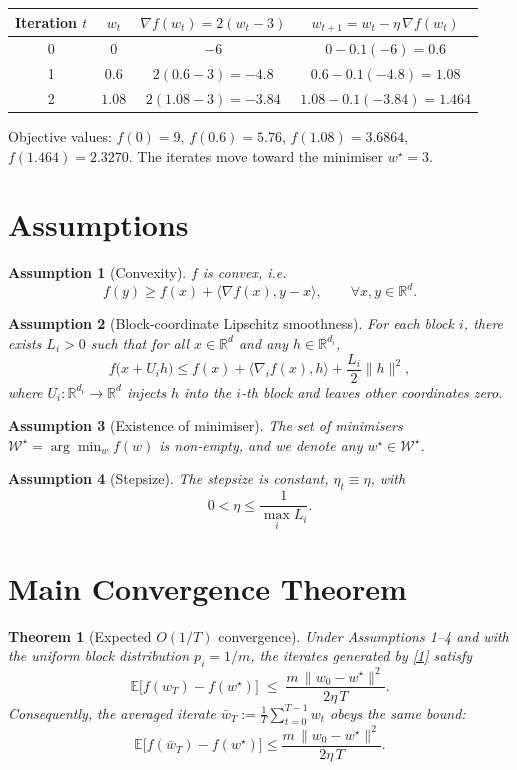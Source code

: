 \documentclass{article}
\newtheorem{theorem}{Theorem}
\newtheorem{assumption}{Assumption}
\newcommand{\E}{\mathbb{E}}
\newcommand{\R}{\mathbb{R}}
\begin{document}
\begin{center}
\begin{tabular}{c|c|c|c}
Iteration $t$ & $w_t$ & $\nabla f(w_t)=2(w_t-3)$ & $w_{t+1}=w_t-\eta\,\nabla f(w_t)$\\\hline
0 & $0$ & $-6$ & $0-0.1(-6)=0.6$\\
1 & $0.6$ & $2(0.6-3)=-4.8$ & $0.6-0.1(-4.8)=1.08$\\
2 & $1.08$ & $2(1.08-3)=-3.84$ & $1.08-0.1(-3.84)=1.464$\\
\end{tabular}
\end{center}
Objective values:
$f(0)=9$, $f(0.6)=5.76$, $f(1.08)=3.6864$, $f(1.464)=2.3270$.
The iterates move toward the minimiser $w^\star=3$.

\newpage
\section*{Assumptions}
\begin{assumption}[Convexity]
$f$ is convex, i.e.
\[
f(y)\ge f(x)+\langle \nabla f(x),y-x\rangle,\qquad\forall x,y\in\R^{d}.
\tag{2}
\]
\end{assumption}
\begin{assumption}[Block‑coordinate Lipschitz smoothness]
For each block $i$, there exists $L_i>0$ such that for all $x\in\R^{d}$ and
any $h\in\R^{d_i}$,
\[
f\bigl(x+U_i h\bigr)\le
f(x)+\langle \nabla_i f(x),h\rangle+\frac{L_i}{2}\|h\|^{2},
\tag{3}
\]
where $U_i:\R^{d_i}\rightarrow\R^{d}$ injects $h$ into the $i$‑th block
and leaves other coordinates zero.
\end{assumption}
\begin{assumption}[Existence of minimiser]
The set of minimisers $\mathcal{W}^{\star}=\arg\min_{w}f(w)$ is non‑empty,
and we denote any $w^{\star}\in\mathcal{W}^{\star}$.
\end{assumption}
\begin{assumption}[Stepsize]
The stepsize is constant, $\eta_t\equiv\eta$, with
\[
0<\eta\le \frac{1}{\max_i L_i}.
\tag{4}
\]
\end{assumption}

\section*{Main Convergence Theorem}
\begin{theorem}[Expected $O(1/T)$ convergence]\label{thm:main}
Under Assumptions 1–4 and with the uniform block distribution
$p_i=1/m$, the iterates generated by \eqref{1} satisfy
\[
\E\!\bigl[f(w_T)-f(w^{\star})\bigr]\;\le\;
\frac{m\,\|w_0-w^{\star}\|^{2}}{2\eta\,T}.
\tag{5}
\]
Consequently, the averaged iterate $\bar w_T:=\frac1T\sum_{t=0}^{T-1}w_t$
obeys the same bound:
\[
\E\!\bigl[f(\bar w_T)-f(w^{\star})\bigr]\le
\frac{m\,\|w_0-w^{\star}\|^{2}}{2\eta\,T}.
\]
\end{theorem}
\end{document}
